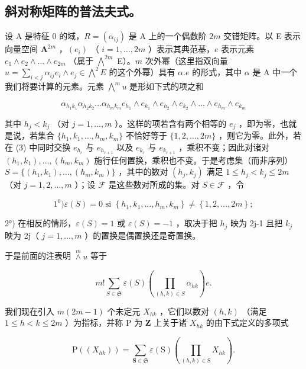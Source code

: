 \subsection{斜对称矩阵的普法夫式。}

设 A 是特征 0 的域，\(R = (\alpha_{ij})\) 是 A 上的一个偶数阶 \(2m\) 交错矩阵。以 E 表示向量空间 \(\mathbf{A}^{2m}\) ，\((e_i)\) （ \(i = 1, \ldots, 2m\) ）表示其典范基，\(e\) 表示元素 \(e_1 \wedge e_2 \wedge \ldots \wedge e_{2m}\) （属于 \(\bigwedge^{2m}\) E）。\(m\) 次外幂（这里指双向量 \(u = \sum_{i < j} \alpha_{ij} e_i \wedge e_j \in \bigwedge^2 E\) 的这个外幂）具有 \(\alpha.e\) 的形式，其中 \(\alpha\) 是 A 中一个我们将要计算的元素。元素 \(\bigwedge^m u\) 是形如下式的项之和

\[
\alpha_ {h _ {1} k _ {1}} \alpha_ {h _ {2} k _ {2}} \dots \alpha_ {h _ {m} k _ {m}} e _ {h _ {1}} \wedge e _ {k _ {1}} \wedge e _ {h _ {2}} \wedge e _ {k _ {2}} \wedge \dots \wedge e _ {h _ {m}} \wedge e _ {k _ {m}}\tag{3}
\]

其中 \(h_j < k_j\) （对 \(j = 1, \ldots, m\) ）。这样的项若含有两个相等的 \(e_j\) ，即为零，也就是说，若集合 \(\{h_1, k_1, \ldots, h_m, k_m\}\) 不恰好等于 \(\{1, 2, \ldots, 2m\}\) ，则它为零。此外，若在 (3) 中同时交换 \(e_{h_r}\) 与 \(e_{h_{r+1}}\) 以及 \(e_{k_r}\) 与 \(e_{k_{r+1}}\) ，乘积不变；因此对诸对 \((h_1, k_1), \ldots, (h_m, k_m)\) 施行任何置换，乘积也不变。于是考虑集（而非序列）\(S = \{(h_1, k_1), \ldots, (h_m, k_m)\}\) ，其中的数对 \((h_j, k_j)\) 满足 \(1 \leqslant h_j < k_j \leqslant 2m\) （对 \(j = 1, 2, \ldots, m\) ）；设 \(\mathscr{F}\) 是这些数对所成的集。对 \(S \in \mathscr{F}\) ，令

\[
1 ^ {0}) \varepsilon (S) = 0 \text {   si   } \left\{h _ {1}, k _ {1}, \dots , h _ {m}, k _ {m} \right\} \neq \left\{1, 2, \dots , 2 m \right\};
\]

2°) 在相反的情形，\(\varepsilon(S)=1\) 或 \(\varepsilon(S)=-1\) ，取决于把 \(h_{j}\) 映为 2j-1 且把 \(k_{j}\) 映为 2j（ \(j=1,\ldots,m\) ）的置换是偶置换还是奇置换。

于是前面的注表明 \(\overset{m}{\wedge} u\) 等于

\[
m! \sum_ {S \in \mathfrak {S}} \varepsilon (S) (\prod_ {(h, k) \in S} \alpha_ {h k}) e.\tag{4}
\]

我们现在引入 \(m(2m-1)\) 个未定元 \(X_{hk}\) ，它们以数对 \((h,k)\) （满足 \(1\leqslant h<k\leqslant2m\) ）为指标，并称 P 为 \(\mathbf{Z}\) 上关于诸 \(X_{hk}\) 的由下式定义的多项式

\[
\mathrm{P} ((X _ {h k})) = \sum_ {\mathbf {S} \in \mathfrak {S}} \varepsilon (\mathrm{S}) (\prod_ {(h, k) \in \mathrm{S}} X _ {h k}).\tag{5}
\]

